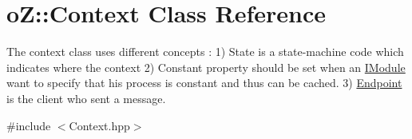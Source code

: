 \hypertarget{classo_z_1_1_context}{}\section{oZ\+::Context Class Reference}
\label{classo_z_1_1_context}


The context class uses different concepts \+: 1) State is a state-\/machine code which indicates where the context 2) Constant property should be set when an \mbox{\hyperlink{classo_z_1_1_i_module}{I\+Module}} want to specify that his process is constant and thus can be cached. 3) \mbox{\hyperlink{classo_z_1_1_endpoint}{Endpoint}} is the client who sent a message.  




{\ttfamily \#include $<$Context.\+hpp$>$}

